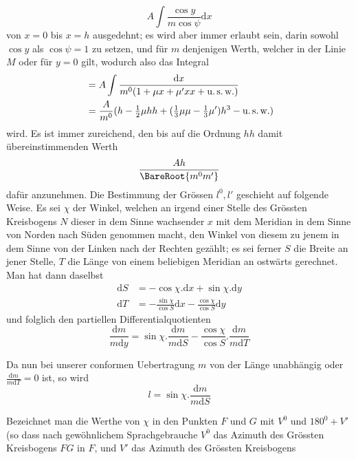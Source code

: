 %
\[
A\int\frac{\cos y}{m\cos\psi}\mathrm{d}x
\]
von \(x=0\) bis \(x=h\) ausgedehnt; es wird aber immer erlaubt sein, darin sowohl \(\cos y\) als \(\cos\psi=1\) zu setzen, und für \(m\) denjenigen Werth, welcher in der Linie \(M\) oder für \(y=0\) gilt, wodurch also das Integral
\[
\begin{aligned}
&=A\int\frac{\mathrm{d}x}{m^0(1+\mu x+\mu'xx+\text{u.\,s.\,w.})}\\
&=\frac{A}{m^0}(h-\tfrac{1}{2}\mu hh+(\tfrac{1}{3}\mu\mu-\tfrac{1}{3}\mu')h^3-\text{u.\,s.\,w.})
\end{aligned}
\]
wird. Es ist immer zureichend, den bis auf die Ordnung \(hh\) damit übereinstimmenden Werth
\[
\frac{Ah}{\BareRoot{m^0m'}}
\]
dafür anzunehmen.
Die Bestimmung der Grössen \(l^0,l'\) geschieht auf folgende Weise. Es sei \(\chi\) der Winkel, welchen an irgend einer Stelle des Grössten Kreisbogens \(N\) dieser in dem Sinne wachsender \(x\) mit dem Meridian in dem Sinne von Norden nach Süden genommen macht, den Winkel von diesem zu jenem in dem Sinne von der Linken nach der Rechten gezählt; es sei ferner \(S\) die Breite an jener Stelle, \(T\) die Länge von einem beliebigen Meridian an ostwärts gerechnet. Man hat dann daselbst
\[
\begin{aligned}
\mathrm{d}S&=-\cos\chi\mathord{.}\mathrm{d}x+\sin\chi\mathord{.}\mathrm{d}y\\
\mathrm{d}T&=-\frac{\sin\chi}{\cos S}\mathrm{d}x-\frac{\cos\chi}{\cos S}\mathrm{d}y
\end{aligned}
\]
und folglich den partiellen Differentialquotienten
\[
\frac{\mathrm{d}m}{m\mathrm{d}y}=\sin\chi\mathord{.}\frac{\mathrm{d}m}{m\mathrm{d}S}-\frac{\cos\chi}{\cos S}\mathord{.}\frac{\mathrm{d}m}{m\mathrm{d}T}
\]

Da nun bei unserer conformen Uebertragung \(m\) von der Länge unabhängig oder \(\tfrac{\mathrm{d}m}{m\mathrm{d}T}=0\) ist, so wird
\[
l=\sin\chi\mathord{.}\frac{\mathrm{d}m}{m\mathrm{d}S}
\]

Bezeichnet man die Werthe von \(\chi\) in den Punkten \(F\) und \(G\) mit \(V^0\) und \(180^0+V'\) (so dass nach gewöhnlichem Sprachgebrauche \(V^0\) das Azimuth des Grössten Kreisbogens \(FG\) in \(F\), und \(V'\) das Azimuth des Grössten Kreisbogens
